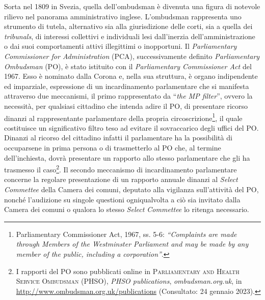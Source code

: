 \documentclass[12pt,it,a4paper,]{report}
\begin{document}
Sorta nel 1809 in Svezia, quella dell'ombudsman è divenuta una figura di
notevole rilievo nel panorama amministrativo inglese. L'ombudsman
rappresenta uno strumento di tutela, alternativo sia alla giurisdizione
delle corti, sia a quella dei \emph{tribunals}, di interessi collettivi
e individuali lesi dall'inerzia dell'amministrazione o dai suoi
comportamenti attivi illegittimi o inopportuni. Il \emph{Parliamentary
Commissioner for Administration} (PCA), successivamente definito
\emph{Parliamentary Ombudsman} (PO), è stato istituito con il
\emph{Parliamentary Commissioner Act} del 1967. Esso è nominato dalla
Corona e, nella sua struttura, è organo indipendente ed imparziale,
espressione di un incardinamento parlamentare che si manifesta
attraverso due meccanismi, il primo rappresentato da ``\emph{the MP
filter}'', ovvero la necessità, per qualsiasi cittadino che intenda
adire il PO, di presentare ricorso dinanzi al rappresentante
parlamentare della propria circoscrizione\footnote{Parliamentary
  Commissioner Act, 1967, ss. 5-6: \emph{``Complaints are made through
  Members of the Westminster Parliament and may be made by any member of
  the public, including a corporation''}.}, il quale costituisce un
significativo filtro teso ad evitare il sovraccarico degli uffici del
PO. Dinanzi al ricorso del cittadino infatti il parlamentare ha la
possibilità di occuparsene in prima persona o di trasmetterlo al PO che,
al termine dell'inchiesta, dovrà presentare un rapporto allo stesso
parlamentare che gli ha trasmesso il caso\footnote{I rapporti del PO
  sono pubblicati online in \textsc{Parliamentary and Health Service
  Ombudsman (PHSO)}, \emph{PHSO publications}, \emph{ombudsman.org.uk},
  in \url{http://www.ombudsman.org.uk/publications} (Consultato: 24
  gennaio 2023).}. Il secondo meccanismo di incardinamento parlamentare
concerne la regolare presentazione di un rapporto annuale dinanzi al
\emph{Select Commettee} della Camera dei comuni, deputato alla vigilanza
sull'attività del PO, nonché l'audizione su singole questioni
ogniqualvolta a ciò sia invitato dalla Camera dei comuni o qualora lo
stesso \emph{Select Commettee} lo ritenga necessario.
\end{document}
